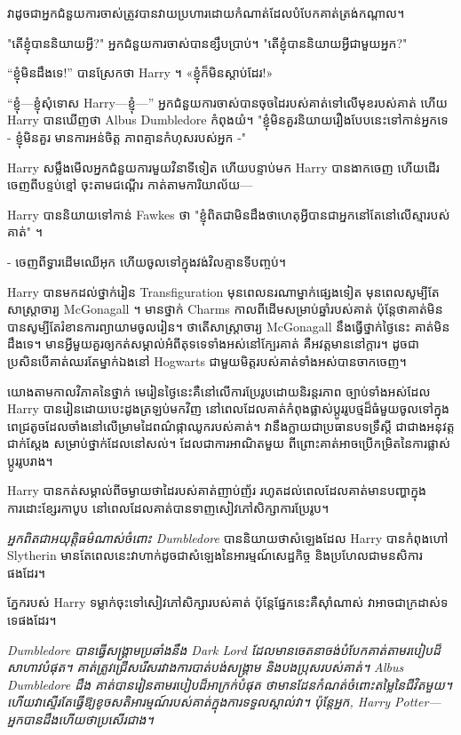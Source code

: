 {{{វាដូចជាអ្នកជំនួយការចាស់ត្រូវបានវាយប្រហារដោយកំណាត់ដែលបំបែកគាត់ត្រង់កណ្តាល។

"តើខ្ញុំបាននិយាយអ្វី?" អ្នកជំនួយការចាស់បានខ្សឹបប្រាប់។ "តើខ្ញុំបាននិយាយអ្វីជាមួយអ្នក?"

“ខ្ញុំមិនដឹងទេ!” បានស្រែកថា Harry ។ «ខ្ញុំក៏មិនស្តាប់ដែរ!»

“ខ្ញុំ—ខ្ញុំសុំទោស Harry—ខ្ញុំ—” អ្នកជំនួយការចាស់បានចុចដៃរបស់គាត់ទៅលើមុខរបស់គាត់ ហើយ Harry បានឃើញថា Albus Dumbledore កំពុងយំ។ "ខ្ញុំមិនគួរនិយាយរឿងបែបនេះទៅកាន់អ្នកទេ - ខ្ញុំមិនគួរ មានការអន់ចិត្ត ភាពគ្មានកំហុសរបស់អ្នក -"

Harry សម្លឹងមើលអ្នកជំនួយការមួយវិនាទីទៀត ហើយបន្ទាប់មក Harry បានងាកចេញ ហើយដើរចេញពីបន្ទប់ខ្មៅ ចុះតាមជណ្តើរ កាត់តាមការិយាល័យ—

Harry បាននិយាយទៅកាន់ Fawkes ថា "ខ្ញុំពិតជាមិនដឹងថាហេតុអ្វីបានជាអ្នកនៅតែនៅលើស្មារបស់គាត់" ។

- ចេញពីទ្វារដើមឈើអុក ហើយចូលទៅក្នុងវង់វិលគ្មានទីបញ្ចប់។

\later

Harry បានមកដល់ថ្នាក់រៀន Transfiguration មុនពេលនរណាម្នាក់ផ្សេងទៀត មុនពេលសូម្បីតែសាស្រ្តាចារ្យ McGonagall ។ មានថ្នាក់ Charms កាលពីដើមសម្រាប់ឆ្នាំរបស់គាត់ ប៉ុន្តែថាគាត់មិនបានសូម្បីតែរំខានការព្យាយាមចូលរៀន។ ថាតើសាស្រ្តាចារ្យ McGonagall នឹងធ្វើថ្នាក់ថ្ងៃនេះ គាត់មិនដឹងទេ។ មាន​អ្វី​មួយ​គួរ​ឲ្យ​កត់​សម្គាល់​អំពី​តុ​ទទេ​ទាំង​អស់​នៅ​ក្បែរ​គាត់ គឺ​អវត្តមាន​នៅ​ក្តារ។ ដូចជាប្រសិនបើគាត់ឈរតែម្នាក់ឯងនៅ Hogwarts ជាមួយមិត្តរបស់គាត់ទាំងអស់បានចាកចេញ។

យោងតាមកាលវិភាគនៃថ្នាក់ មេរៀនថ្ងៃនេះគឺនៅលើការប្រែរូបដោយនិរន្តរភាព ច្បាប់ទាំងអស់ដែល Harry បានរៀនដោយបេះដូងត្រឡប់មកវិញ នៅពេលដែលគាត់កំពុងផ្លាស់ប្តូររូបថ្មដ៏ធំមួយចូលទៅក្នុងពេជ្រតូចដែលចាំងនៅលើម្រាមដៃពណ៌ផ្កាឈូករបស់គាត់។ វានឹងក្លាយជាប្រធានបទទ្រឹស្តី ជាជាងអនុវត្តជាក់ស្តែង សម្រាប់ថ្នាក់ដែលនៅសល់។ ដែលជាការអាណិតមួយ ពីព្រោះគាត់អាចប្រើកម្រិតនៃការផ្លាស់ប្តូររូបរាង។

Harry បានកត់សម្គាល់ពីចម្ងាយថាដៃរបស់គាត់ញាប់ញ័រ រហូតដល់ពេលដែលគាត់មានបញ្ហាក្នុងការដោះខ្សែរកាបូប នៅពេលដែលគាត់បានទាញសៀវភៅសិក្សាការប្រែរូប។

\emph{អ្នកពិតជាអយុត្តិធម៌ណាស់ចំពោះ Dumbledore} បាននិយាយថាសំឡេងដែល Harry បានកំពុងហៅ Slytherin មានតែពេលនេះវាហាក់ដូចជាសំឡេងនៃអារម្មណ៍សេដ្ឋកិច្ច និងប្រហែលជាមនសិការផងដែរ។

ភ្នែករបស់ Harry ទម្លាក់ចុះទៅសៀវភៅសិក្សារបស់គាត់ ប៉ុន្តែផ្នែកនេះគឺស៊ាំណាស់ វាអាចជាក្រដាស់ទទេផងដែរ។

\emph{ Dumbledore បានធ្វើសង្គ្រាមប្រឆាំងនឹង Dark Lord ដែលមានចេតនាចង់បំបែកគាត់តាមរបៀបដ៏សាហាវបំផុត។ គាត់ត្រូវជ្រើសរើសរវាងការបាត់បង់សង្រ្គាម និងបងប្រុសរបស់គាត់។ Albus Dumbledore ដឹង គាត់បានរៀនតាមរបៀបដ៏អាក្រក់បំផុត ថាមានដែនកំណត់ចំពោះតម្លៃនៃជីវិតមួយ។ ហើយវាស្ទើរតែធ្វើឱ្យខូចសតិអារម្មណ៍របស់គាត់ក្នុងការទទួលស្គាល់វា។ ប៉ុន្តែអ្នក, Harry Potter—\emph{អ្នក}បានដឹងហើយថាប្រសើរជាង។}

}}}
